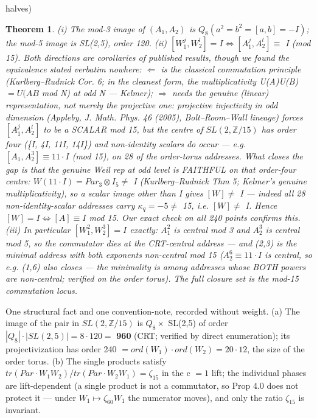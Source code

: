 \documentclass[11pt]{article}
\theoremstyle{plain}
\newtheorem{theorem}{Theorem}[section]
\theoremstyle{definition}
\theoremstyle{remark}
\begin{document}
halves)

\begin{theorem}
(i) The mod-3 image of \((A_{1}, A_{2})\) is \(Q_{8} (a^{2} = b^{2} = [a,b] = -I)\); the mod-5 image is SL(2,5), order 120. (ii) \([W_{1}^{j}, W_{2}^{l}] = I \Longleftrightarrow  [A_{1}^{j}, A_{2}^{l}] \equiv \) I (mod 15). Both directions are corollaries of published results, though we found the equivalence stated verbatim nowhere: \(\Longleftarrow \) is the classical commutation principle (Kurlberg–Rudnick Cor. 6; in the cleanest form, the multiplicativity U(A)U(B) \(= U(AB\) mod N) at odd N — Kelmer); \(\Longrightarrow \) needs the \emph{genuine} (linear) representation, not merely the projective one: projective injectivity in odd dimension (Appleby, J. Math. Phys. 46 (2005), Bolt–Room–Wall lineage) forces \([A_{1}^{j}, A_{2}^{l}]\) to be a SCALAR mod 15, but the centre of \(SL(2,\mathbb{Z}/15)\) has order four (\{I, 4I, 11I, 14I\}) and non-identity scalars do occur — e.g. \([A_{1}, A_{2}^{3}] \equiv  11\cdot I\) (mod 15), on 28 of the order-torus addresses. What closes the gap is that the genuine Weil rep at odd level is FAITHFUL on that order-four centre: \(W(11\cdot I) = Par_{3} \otimes  I_{5} \neq \) I (Kurlberg–Rudnick Thm 5; Kelmer's genuine multiplicativity), so a scalar image other than I gives \([W] \neq \) I — indeed all 28 non-identity-scalar addresses carry \(\kappa _{q} = -5 \neq \) 15, i.e. \([W] \neq \) I. Hence \([W]=I \Longleftrightarrow  [A]\equiv I\) mod 15. Our exact check on all 240 points confirms this. (iii) In particular \([W_{1}^{2}, W_{2}^{3}] = I\) exactly: \(A_{1}^{2}\) is central mod 3 and \(A_{2}^{3}\) is central mod 5, so the commutator dies at the CRT-central address — and (2,3) is the minimal address with both exponents non-central mod 15 (\(A_{2}^{6} \equiv  11\cdot I\) is central, so e.g. (1,6) also closes — the minimality is among addresses whose BOTH powers are non-central; verified on the order torus). The full closure set is the mod-15 commutation locus.
\end{theorem}

One structural fact and one convention-note, recorded without weight. (a) The image of the pair in \(SL(2,\mathbb{Z}/15)\) is \(Q_{8} \times \) SL(2,5) of order \(|Q_{8}|\cdot |SL(2,5)| = 8\cdot 120 =\) \textbf{960} (CRT; verified by direct enumeration); its projectivization has order 240 \(= ord(W_{1})\cdot ord(W_{2}) = 20\cdot 12\), the size of the order torus. (b) The single products satisfy \(tr(Par\cdot W_{1}W_{2})/tr(Par\cdot W_{2}W_{1}) = \zeta _{15}\) in the c \(= 1\) lift; the individual phases are lift-dependent (a single product is not a commutator, so Prop 4.0 does not protect it — under \(W_{1} \mapsto  \zeta _{60}W_{1}\) the numerator moves), and only the ratio \(\zeta _{15}\) is invariant.
\end{document}
